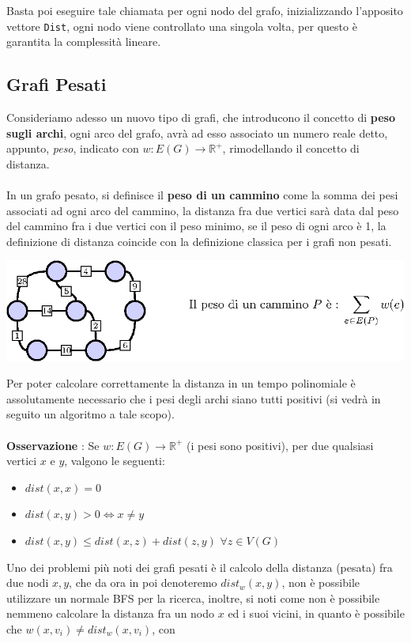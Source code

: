 \documentclass[12pt, letterpaper]{article}
\newcommand{\code}[1]{\colorbox{light-gray}{\texttt{#1}}}
\newcommand{\acc}{\\\hphantom{}\\}
\begin{document}
Basta poi eseguire tale chiamata per ogni nodo del grafo, inizializzando l'apposito vettore \code{Dist}, ogni nodo viene controllato
una singola volta, per questo è garantita la complessità lineare.
\subsection{Grafi Pesati}\label{grafiPesati}
Consideriamo adesso un nuovo tipo di grafi, che introducono il concetto di \textbf{peso sugli archi}, ogni arco del grafo,
avrà ad esso associato un numero reale detto, appunto, \textit{peso}, indicato con $w : E(G)\rightarrow \mathbb{R}^+$,
rimodellando il concetto di distanza.\acc
In un grafo pesato, si definisce il \textbf{peso di un cammino} come la somma dei pesi associati ad ogni arco del cammino,
la distanza fra due vertici sarà data dal peso del cammino fra i due vertici con il peso minimo, se il peso di ogni
arco è 1, la definizione di distanza coincide con la definizione classica per i grafi non pesati. \begin{center}
    \includegraphics[width=1\textwidth ]{images/grafoPesato.eps}
\end{center}
Per poter calcolare correttamente la distanza in un tempo polinomiale è assolutamente necessario che
i pesi degli archi siano tutti positivi (si vedrà in seguito un algoritmo a tale scopo).\acc
\textbf{Osservazione} : Se  $w : E(G)\rightarrow \mathbb{R}^+$ (i pesi sono positivi), per due qualsiasi
vertici $x$ e $y$, valgono le seguenti:\begin{itemize}
    \item $dist(x,x)=0$
    \item $dist(x,y)>0\iff x\ne y$
    \item $dist(x,y)\le dist(x,z)+dist(z,y)$ $\forall z\in V(G)$
\end{itemize}
Uno dei problemi più noti dei grafi pesati è il calcolo della distanza (pesata) fra due nodi $x,y$, che da ora in
poi denoteremo $dist_w(x,y)$, non è possibile utilizzare un normale BFS per la ricerca, inoltre, si noti come non è possibile
nemmeno calcolare la distanza fra un nodo $x$ ed i suoi vicini, in quanto è possibile che $w(x,v_i)\ne dist_w(x,v_i)$, con
\end{document}
